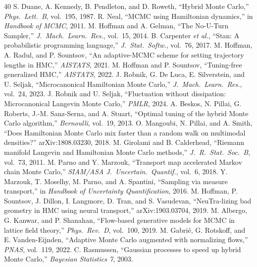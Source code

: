 \documentclass[10pt,journal,compsoc]{IEEEtran}
\begin{document}
\begin{thebibliography}{40}\small
{} S. Duane, A. Kennedy, B. Pendleton, and D. Roweth,
``Hybrid Monte Carlo,'' \emph{Phys.\ Lett.\ B}, vol.~195, 1987.
 R. Neal, ``MCMC using Hamiltonian dynamics,'' in
\emph{Handbook of MCMC}, 2011.
 M. Hoffman and A. Gelman, ``The No-U-Turn Sampler,''
\emph{J.\ Mach.\ Learn.\ Res.}, vol.~15, 2014.
 B. Carpenter \emph{et al.}, ``Stan: A probabilistic
programming language,'' \emph{J.\ Stat.\ Softw.}, vol.~76, 2017.
 M. Hoffman, A. Radul, and P. Sountsov, ``An
adaptive-MCMC scheme for setting trajectory lengths in HMC,''
\emph{AISTATS}, 2021.
 M. Hoffman and P. Sountsov, ``Tuning-free generalized
HMC,'' \emph{AISTATS}, 2022.
 J. Robnik, G. De Luca, E. Silverstein, and U. Seljak,
``Microcanonical Hamiltonian Monte Carlo,'' \emph{J.\ Mach.\ Learn.\ Res.},
vol.~24, 2023.
 J. Robnik and U. Seljak, ``Fluctuation without
dissipation: Microcanonical Langevin Monte Carlo,'' \emph{PMLR}, 2024.
 A. Beskos, N. Pillai, G. Roberts, J.-M. Sanz-Serna,
and A. Stuart, ``Optimal tuning of the hybrid Monte Carlo algorithm,''
\emph{Bernoulli}, vol.~19, 2013.
 O. Mangoubi, N. Pillai, and A. Smith, ``Does
Hamiltonian Monte Carlo mix faster than a random walk on multimodal
densities?'' arXiv:1808.03230, 2018.
 M. Girolami and B. Calderhead, ``Riemann manifold
Langevin and Hamiltonian Monte Carlo methods,'' \emph{J.\ R.\ Stat.\ Soc.\
B}, vol.~73, 2011.
 M. Parno and Y. Marzouk, ``Transport map accelerated
Markov chain Monte Carlo,'' \emph{SIAM/ASA J.\ Uncertain.\ Quantif.},
vol.~6, 2018.
 Y. Marzouk, T. Moselhy, M. Parno, and A. Spantini,
``Sampling via measure transport,'' in \emph{Handbook of Uncertainty
Quantification}, 2016.
 M. Hoffman, P. Sountsov, J. Dillon, I. Langmore,
D. Tran, and S. Vasudevan, ``NeuTra-lizing bad geometry in HMC using neural
transport,'' arXiv:1903.03704, 2019.
 M. Albergo, G. Kanwar, and P. Shanahan,
``Flow-based generative models for MCMC in lattice field theory,''
\emph{Phys.\ Rev.\ D}, vol.~100, 2019.
 M. Gabri\'e, G. Rotskoff, and E. Vanden-Eijnden,
``Adaptive Monte Carlo augmented with normalizing flows,'' \emph{PNAS},
vol.~119, 2022.
 C. Rasmussen, ``Gaussian processes to speed up
hybrid Monte Carlo,'' \emph{Bayesian Statistics 7}, 2003.

\end{thebibliography}
\end{document}

